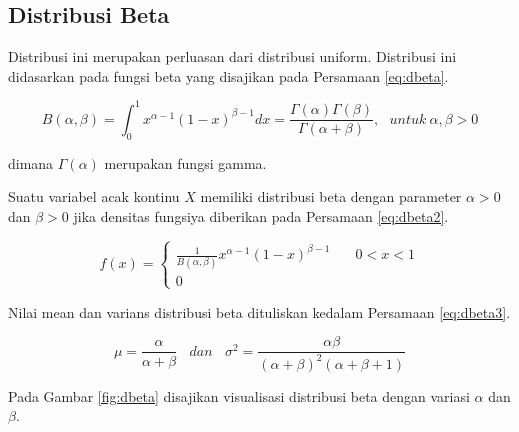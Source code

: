 \documentclass[]{book}
\begin{document}
\subsection{Distribusi Beta}\label{distribusi-beta}

Distribusi ini merupakan perluasan dari distribusi uniform. Distribusi
ini didasarkan pada fungsi beta yang disajikan pada Persamaan
\eqref{eq:dbeta}.

\begin{equation}
   B\left(\alpha,\beta\right)=\int_0^1x^{\alpha-1}\left(1-x\right)^{\beta-1}dx=\frac{\Gamma\left(\alpha\right)\Gamma\left(\beta\right)}{\Gamma\left(\alpha+\beta\right)},\ \ \ untuk\ \alpha,\beta>0
  \label{eq:dbeta}
\end{equation}

dimana \(\Gamma\left(\alpha\right)\) merupakan fungsi gamma.

Suatu variabel acak kontinu \(X\) memiliki distribusi beta dengan
parameter \(\alpha>0\) dan \(\beta>0\) jika densitas fungsiya diberikan
pada Persamaan \eqref{eq:dbeta2}.

\begin{equation}
f\left(x \right) =
  \begin{cases}
    \frac{1}{B\left(\alpha,\beta\right)}x^{\alpha-1}\left(1-x\right)^{\beta-1}       & \quad 0<x<1\\
    0                   & \quad\text{}
    \end{cases}
 \label{eq:dbeta2}
\end{equation}

Nilai mean dan varians distribusi beta dituliskan kedalam Persamaan
\eqref{eq:dbeta3}.

\begin{equation}
   \mu=\frac{\alpha}{\alpha+\beta}\ \ \ \ dan\ \ \ \ \sigma^2=\frac{\alpha\beta}{\left(\alpha+\beta\right)^2\left(\alpha+\beta+1\right)}
  \label{eq:dbeta3}
\end{equation}

Pada Gambar \ref{fig:dbeta} disajikan visualisasi distribusi beta dengan
variasi \(\alpha\) dan \(\beta\).
\end{document}
